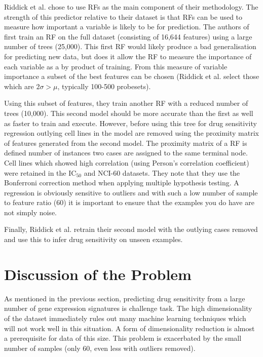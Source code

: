 \documentclass[journal]{IEEEtran}
\begin{document}
Riddick et al. chose to use RFs as the main component of their methodology. The strength of this predictor relative to their dataset is that RFs can be used to measure how important a variable is likely to be for prediction. The authors of \cite{riddick2011predicting} first train an RF on the full dataset (consisting of 16,644 features) using a large number of trees (25,000). This first RF would likely produce a bad generalisation for predicting new data, but does it allow the RF to measure the importance of each variable as a by product of training. From this measure of variable importance a subset of the best features can be chosen (Riddick et al. select those which are $2 \sigma > \mu$, typically 100-500 probesets).

Using this subset of features, they train another RF with a reduced number of trees (10,000). This second model should be more accurate than the first as well as faster to train and execute. However, before using this tree for drug sensitivity regression outlying cell lines in the model are removed using the proximity matrix of features generated from the second model. The proximity matrix of a RF is defined number of instances two cases are assigned to the same terminal node. Cell lines which showed high correlation (using Person's correlation coefficient) were retained in the IC$_{50}$ and NCI-60 datasets. They note that they use the Bonferroni correction method \cite{abdi2007bonferonni} when applying multiple hypothesis testing. A regression is obviously sensitive to outliers and with such a low number of sample to feature ratio (60) it is important to ensure that the examples you do have are not simply noise.

Finally, Riddick et al. retrain their second model with the outlying cases removed and use this to infer drug sensitivity on unseen examples.

\section{Discussion of the Problem}
\label{sec:problem-discussion}
As mentioned in the previous section, predicting drug sensitivity from a large number of gene expression signatures is challenge task. The high dimensionality of the dataset immediately rules out many machine learning techniques which will not work well in this situation. A form of dimensionality reduction is almost a prerequisite for data of this size. This problem is exacerbated by the small number of samples (only 60, even less with outliers removed).
\end{document}
